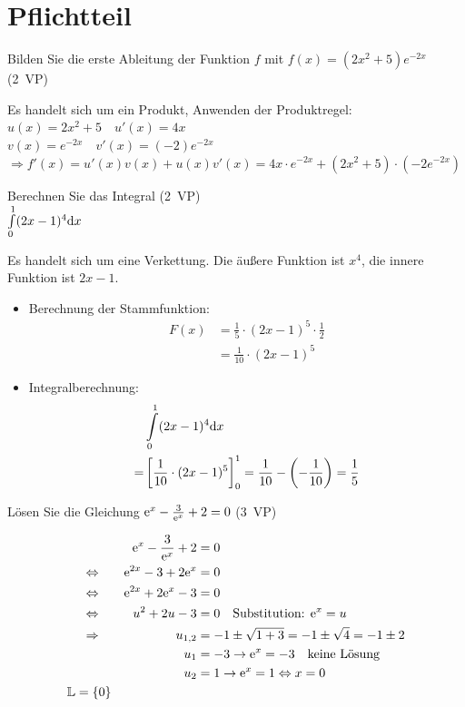 
\usepackage{tabularx}

\newcommand{\pts}[1]{\hfill \mbox{(#1 VP)}}


\section{Pflichtteil}
\aufgabe{} Bilden Sie die erste Ableitung der Funktion $f$ mit $f(x) = (2x^2+5)e^{-2x}$ \pts{2}
\begin{lsg}{}
Es handelt sich um ein Produkt, Anwenden der Produktregel:\\
$u(x) = 2x^2+5 \quad u'(x)=4x$\\
$v(x) = e^{-2x} \quad v'(x)=(-2)e^{-2x}$\\
$\Rightarrow f'(x)=u'(x)v(x)+u(x)v'(x) = 4x\cdot e^{-2x}+(2x^2+5)\cdot(-2e^{-2x})$
\end{lsg}

\aufgabe{} Berechnen Sie das Integral \pts{2}\\
$\int\limits_0^1(2x-1)^4 \mathrm{d} x$
\begin{lsg}{}
Es handelt sich um eine Verkettung.
Die äußere Funktion ist $x^4$, die innere Funktion ist $2x-1$.\\
\begin{itemize}
  \item  Berechnung der Stammfunktion:
  \begin{align*}
    F(x) &= \frac 1 5 \cdot(2x-1)^5\cdot\frac 1 2\\
    &=\frac{1}{10}\cdot(2x-1)^5
  \end{align*}
  \item Integralberechnung:
  \begin{align*}
    &\int\limits_0^1(2x-1)^4 \mathrm{d} x\\
    =&\left[\frac{1}{10}\cdot(2x-1)^5\right]^1_0 = \frac{1}{10}-\left(-\frac{1}{10}\right) = \frac 1 5
  \end{align*}
\end{itemize}
\end{lsg}

\aufgabe{}Lösen Sie die Gleichung $\mathrm{e}^x-\frac{3}{\mathrm{e}^x}+2=0$ \pts{3}\\
\begin{lsg}{}
\begin{alignat*}{2}
    &&\mathrm{e}^x-\frac{3}{\mathrm{e}^x}+2 &= 0\\
    \Leftrightarrow\quad && \mathrm{e}^{2x}-3+2\mathrm{e}^x &= 0\\
    \Leftrightarrow\quad && \mathrm{e}^{2x}+2\mathrm{e}^x-3 &= 0\\
    \Leftrightarrow\quad && u^2+2u-3 &= 0 \quad\text{Substitution: }\mathrm{e}^x=u\\
    \Rightarrow\quad && u_{1,2} &= -1\pm\sqrt{1+3}=-1\pm\sqrt{4}=-1\pm2\\
    && u_1 &= -3 \rightarrow \mathrm{e}^x = -3 \quad\text{keine Lösung}\\
    && u_2 &= 1 \rightarrow \mathrm{e}^x = 1 \Leftrightarrow x=0\\
    \mathbb{L} = \{0\}
\end{alignat*}
\end{lsg}

